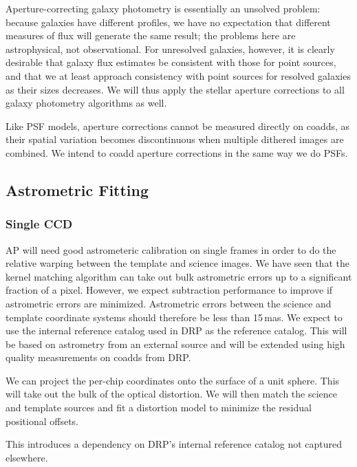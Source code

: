 Aperture-correcting galaxy photometry is essentially an unsolved problem: because galaxies have different profiles, we have no expectation that different measures of flux will generate the same result; the problems here are astrophysical, not observational.  For unresolved galaxies, however, it is clearly desirable that galaxy flux estimates be consistent with those for point sources, and that we at least approach consistency with point sources for resolved galaxies as their sizes decreases.  We will thus apply the stellar aperture corrections to all galaxy photometry algorithms as well.

Like PSF models, aperture corrections cannot be measured directly on coadds, as their spatial variation becomes discontinuous when multiple dithered images are combined.  We intend to coadd aperture corrections in the same way we do PSFs.

\subsection{Astrometric Fitting}
\label{sec:acAstrometricFitting}
\subsubsection{Single CCD}
\label{sec:acSingleCCDAstrometricFit}

AP will need good astrometeric calibration on single frames in order to do the relative warping between the template and science images.  We have seen that the kernel matching algorithm can take out bulk astrometric errors up to a significant fraction of a pixel.  However, we expect subtraction performance to improve if astrometric errors are minimized.  Astrometric errors between the science and template coordinate systems should therefore be less than 15\,mas.  We expect to use the internal reference catalog used in DRP as the reference catalog.  This will be based on astrometry from an external source and will be extended using high quality measurements on coadds from DRP.

We can project the per-chip coordinates onto the surface of a unit sphere.
This will take out the bulk of the optical distortion.
We will then match the science and template sources and fit a distortion model to minimize the residual positional offsets.

\begin{note}[Dependency]
This introduces a dependency on DRP's internal reference catalog not captured elsewhere.
\end{note}

